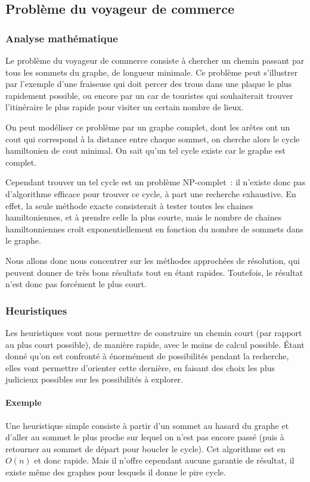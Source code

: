 \subsection{Problème du voyageur de commerce}\label{sec:tsp}
  \subsubsection{Analyse mathématique}
    Le problème du voyageur de commerce consiste à chercher un chemin passant
    par tous les sommets du graphe, de longueur minimale.
    Ce problème peut s'illustrer par l'exemple d'une
    fraiseuse qui doit percer des trous dans une plaque le plus
    rapidement possible, ou encore par un car de touristes qui souhaiterait
    trouver l'itinéraire le plus rapide pour visiter un certain nombre de lieux.

    On peut modéliser ce problème par un graphe complet, dont les arêtes ont un
    cout qui correspond à la distance entre chaque sommet, on cherche alors le
    cycle hamiltonien de cout minimal. On sait qu'un tel cycle existe car le
    graphe est complet.

    Cependant trouver un tel cycle est un problème NP-complet~: il n'existe
    donc pas d'algorithme efficace pour trouver ce cycle, à part une recherche
    exhaustive.
    En effet, la seule méthode exacte consisterait à tester toutes les chaines
    hamiltoniennes, et à prendre celle la plus courte, mais le nombre de chaines
    hamiltonniennes croît exponentiellement en fonction du nombre de sommets
    dans le graphe.

    Nous allons donc nous concentrer sur les méthodes approchées de résolution,
    qui peuvent donner de très bons résultats tout en étant rapides.
    Toutefois, le résultat n'est donc pas forcément le plus court.

  \subsubsection{Heuristiques}
    Les heuristiques vont nous permettre de construire un chemin court (par
    rapport au plus court possible), de manière rapide, avec le moins de calcul
    possible.  Étant donné qu'on est confronté à énormément de possibilités
    pendant la recherche, elles vont permettre d'orienter cette dernière, en
    faisant des choix les plus judicieux possibles sur les possibilités à
    explorer.

    \paragraph{Exemple} Une heuristique simple consiste à partir d'un sommet au
    hasard du graphe et d'aller au sommet le plus proche sur lequel on n'est
    pas encore passé (puis à retourner au sommet de départ pour boucler le
    cycle). Cet algorithme est en $O(n)$ et donc rapide. Mais il n'offre
    cependant aucune garantie de résultat, il existe même des graphes pour
    lesquels il donne le pire cycle.

